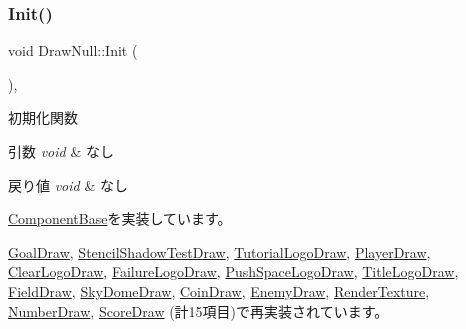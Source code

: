 \subsubsection{\texorpdfstring{Init()}{Init()}}
{\footnotesize\ttfamily void Draw\+Null\+::\+Init (\begin{DoxyParamCaption}{ }\end{DoxyParamCaption})\hspace{0.3cm}{\ttfamily [override]}, {\ttfamily [virtual]}}



初期化関数 


\begin{DoxyParams}{引数}
{\em void} & なし \\
\hline
\end{DoxyParams}

\begin{DoxyRetVals}{戻り値}
{\em void} & なし \\
\hline
\end{DoxyRetVals}


\mbox{\hyperlink{class_component_base_a125939d6befe42f28886a6523e86b18b}{Component\+Base}}を実装しています。



\mbox{\hyperlink{class_goal_draw_a3eb0a555fa2db9d2c1253018ea65796e}{Goal\+Draw}}, \mbox{\hyperlink{class_stencil_shadow_test_draw_a65be72e71cd12cacf315b0364c12c3e3}{Stencil\+Shadow\+Test\+Draw}}, \mbox{\hyperlink{class_tutorial_logo_draw_a53fc4b1b23c7f9e249600be67510f944}{Tutorial\+Logo\+Draw}}, \mbox{\hyperlink{class_player_draw_ad79a0fbeb618e0913822b573e5d0be68}{Player\+Draw}}, \mbox{\hyperlink{class_clear_logo_draw_a9af656c0a8ebfb5fa133a0983add6ffd}{Clear\+Logo\+Draw}}, \mbox{\hyperlink{class_failure_logo_draw_a718d587edcabb1feea72153a79a65176}{Failure\+Logo\+Draw}}, \mbox{\hyperlink{class_push_space_logo_draw_a7ad3fe53d9bda4ea16c958bc102ff54e}{Push\+Space\+Logo\+Draw}}, \mbox{\hyperlink{class_title_logo_draw_a9f70fb70639510908f4e07ee14667e30}{Title\+Logo\+Draw}}, \mbox{\hyperlink{class_field_draw_a4287d2ce33033b2413c1d3a81b173373}{Field\+Draw}}, \mbox{\hyperlink{class_sky_dome_draw_a5b82e8b650a20dbc0b7ed720d1fb7fab}{Sky\+Dome\+Draw}}, \mbox{\hyperlink{class_coin_draw_ad0f5da5cfb896541fd59b1ab4a8593d1}{Coin\+Draw}}, \mbox{\hyperlink{class_enemy_draw_aa1659c35fa757db6a6cf07e26ad9ddfb}{Enemy\+Draw}}, \mbox{\hyperlink{class_render_texture_a498eb8be8672e01164b3770cdff43291}{Render\+Texture}}, \mbox{\hyperlink{class_number_draw_ad52c1e8b9ae6e830a82c440cc18cb6c9}{Number\+Draw}}, \mbox{\hyperlink{class_score_draw_af013abb96136825e71d4fee06529fc69}{Score\+Draw}} (計15項目)で再実装されています。



